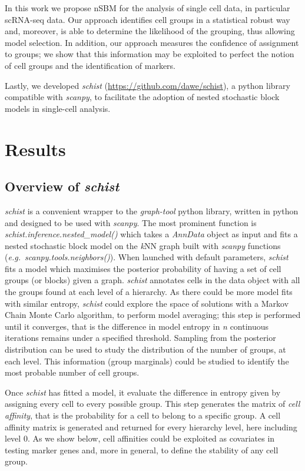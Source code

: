 \documentclass{bmcart}
\begin{document}
In this work we propose nSBM for the analysis of single cell data, in particular scRNA-seq data. Our approach identifies cell groups in a statistical robust way and, moreover, is able to determine the likelihood of the grouping, thus allowing model selection. In addition, our approach measures the confidence of assignment to groups; we show that this information may be exploited to perfect the notion of cell groups and the identification of markers.

Lastly, we developed \emph{schist} (\href{https://github.com/dawe/schist}{https:/\slash github.com\slash dawe\slash schist}), a python library compatible with \emph{scanpy}, to facilitate the adoption of nested stochastic block models in single-cell analysis.

\section*{Results}

\subsection*{Overview of \emph{schist}}

\emph{schist} is a convenient wrapper to the \emph{graph-tool} python library, written in python and designed to be used with \emph{scanpy}. The most prominent function is \emph{schist.inference.nested\_model()} which takes a \emph{AnnData} object as input and fits a nested stochastic block model on the \emph{k}NN graph built with \emph{scanpy} functions (\emph{e.g.\ scanpy.tools.neighbors()}). When launched with default parameters, \emph{schist} fits a model which maximises the posterior probability of having a set of cell groups (or blocks) given a graph. \emph{schist} annotates cells in the data object with all the groups found at each level of a hierarchy. As there could be more model fits with similar entropy, \emph{schist} could explore the space of solutions with a Markov Chain Monte Carlo algorithm, to perform model averaging; this step is performed until it converges, that is the difference in model entropy in \emph{n} continuous iterations remains under a specified threshold. Sampling from the posterior distribution can be used to study the distribution of the number of groups, at each level. This information (group marginals) could be studied to identify the most probable number of cell groups.

Once \emph{schist} has fitted a model, it evaluate the difference in entropy given by assigning every cell to every possible group. This step generates the matrix of \emph{cell affinity}, that is the probability for a cell to belong to a specific group. A cell affinity matrix is generated and returned for every hierarchy level, here including level 0. As we show below, cell affinities could be exploited as covariates in testing marker genes and, more in general, to define the stability of any cell group.
\end{document}
